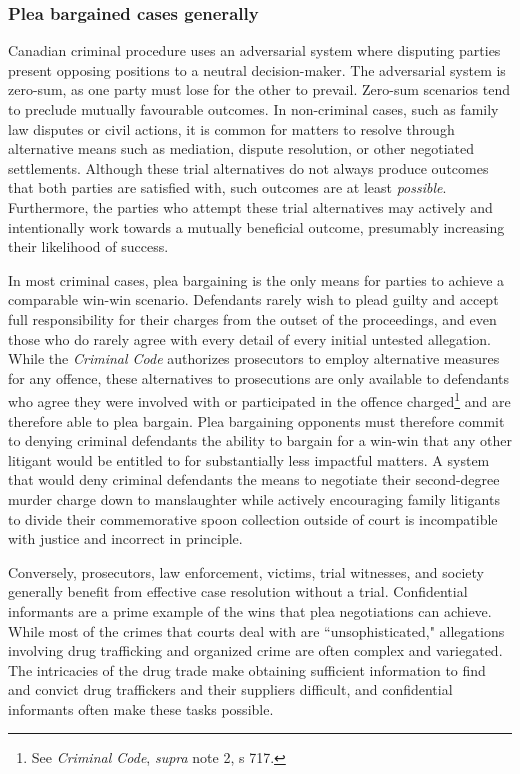 \subsubsection{Plea bargained cases generally}

Canadian criminal procedure uses an adversarial system where disputing parties present opposing positions to a neutral decision-maker. The adversarial system is zero-sum, as one party must lose for the other to prevail. Zero-sum scenarios tend to preclude mutually favourable outcomes. In non-criminal cases, such as family law disputes or civil actions, it is common for matters to resolve through alternative means such as mediation, dispute resolution, or other negotiated settlements. Although these trial alternatives do not always produce outcomes that both parties are satisfied with, such outcomes are at least \textit{possible}. Furthermore, the parties who attempt these trial alternatives may actively and intentionally work towards a mutually beneficial outcome, presumably increasing their likelihood of success.

In most criminal cases, plea bargaining is the only means for parties to achieve a comparable win-win scenario. Defendants rarely wish to plead guilty and accept full responsibility for their charges from the outset of the proceedings, and even those who do rarely agree with every detail of every initial untested allegation. While the \textit{Criminal Code} authorizes prosecutors to employ alternative measures for any offence, these alternatives to prosecutions are only available to defendants who agree they were involved with or participated in the offence charged\footnote{See \textit{Criminal Code}, \textit{supra} note 2, s 717.} and are therefore able to plea bargain. Plea bargaining opponents must therefore commit to denying criminal defendants the ability to bargain for a win-win that any other litigant would be entitled to for substantially less impactful matters. A system that would deny criminal defendants the means to negotiate their second-degree murder charge down to manslaughter while actively encouraging family litigants to divide their commemorative spoon collection outside of court is incompatible with justice and incorrect in principle.

Conversely, prosecutors, law enforcement, victims, trial witnesses, and society generally benefit from effective case resolution without a trial. Confidential informants are a prime example of the wins that plea negotiations can achieve. While most of the crimes that courts deal with are ``unsophisticated," allegations involving drug trafficking and organized crime are often complex and variegated. The intricacies of the drug trade make obtaining sufficient information to find and convict drug traffickers and their suppliers difficult, and confidential informants often make these tasks possible.

